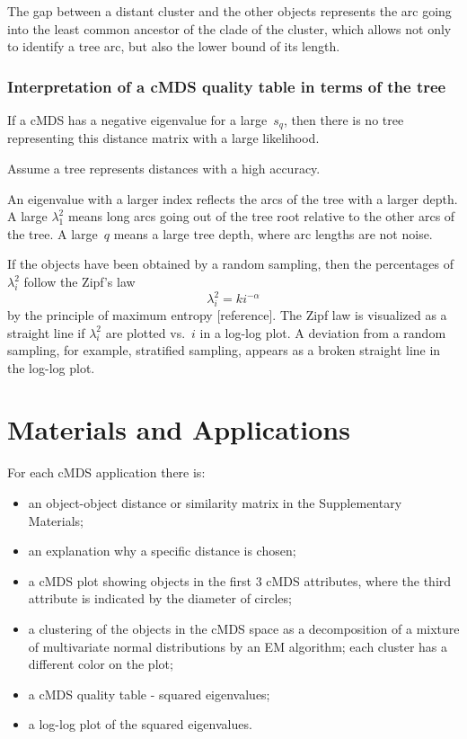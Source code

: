 \documentclass[10pt,a4paper]{article}
\begin{document}
The gap between a distant cluster and the other objects represents the arc going into the least common ancestor of the clade of the cluster, which allows not only to identify a tree arc, but also the lower bound of its length. 


\subsubsection {Interpretation of a cMDS quality table in terms of the tree}

If a cMDS has a negative eigenvalue for a large~$s_q$, then there is no tree representing this distance matrix with a large likelihood.

Assume a tree represents distances with a high accuracy.

An eigenvalue with a larger index reflects the arcs of the tree with a larger depth. 
A large $\lambda_1^2$ means long arcs going out of the tree root relative to the other arcs of the tree. 
A large~$q$ means a large tree depth, where arc lengths are not noise.

If the objects have been obtained by a random sampling, then the percentages of $\lambda_i^2$ follow the Zipf's law
$$ \lambda_i^2 = k i^{-\alpha}$$
by the principle of maximum entropy [reference]. 
The Zipf law is visualized as a straight line if $\lambda_i^2$ are plotted vs.~$i$ in a log-log plot. 
A deviation from a random sampling, for example, stratified sampling, appears as a broken straight line in the log-log plot.



\section{Materials and Applications}

For each cMDS application there is:
\begin{itemize}
\item an object-object distance or similarity matrix in the Supplementary Materials;
\item an explanation why a specific distance is chosen;
\item a cMDS plot showing objects in the first 3 cMDS attributes, 
  where the third attribute is indicated by the diameter of circles; 
\item a clustering of the objects in the cMDS space 
      as a decomposition of a mixture of multivariate normal distributions by an EM  algorithm; 
      each cluster has a different color on the plot;
\item a cMDS quality table - squared eigenvalues;
\item a log-log plot of the squared eigenvalues.
\end{itemize}
\end{document}
